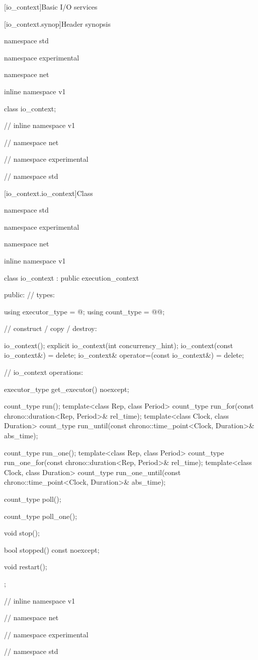 
[io_context]{Basic I/O services}


%
[io_context.synop]{Header  synopsis}

\begin{codeblock}
namespace std {
namespace experimental {
namespace net {
inline namespace v1 {

  class io_context;

} // inline namespace v1
} // namespace net
} // namespace experimental
} // namespace std
\end{codeblock}



[io_context.io_context]{Class }

%
\begin{codeblock}
namespace std {
namespace experimental {
namespace net {
inline namespace v1 {

  class io_context : public execution_context
  {
  public:
    // types:

    using executor_type = @\seebelow@;
    using count_type = @@;

    // construct / copy / destroy:

    io_context();
    explicit io_context(int concurrency_hint);
    io_context(const io_context&) = delete;
    io_context& operator=(const io_context&) = delete;

    // io_context operations:

    executor_type get_executor() noexcept;

    count_type run();
    template<class Rep, class Period>
      count_type run_for(const chrono::duration<Rep, Period>& rel_time);
    template<class Clock, class Duration>
      count_type run_until(const chrono::time_point<Clock, Duration>& abs_time);

    count_type run_one();
    template<class Rep, class Period>
      count_type run_one_for(const chrono::duration<Rep, Period>& rel_time);
    template<class Clock, class Duration>
      count_type run_one_until(const chrono::time_point<Clock, Duration>& abs_time);

    count_type poll();

    count_type poll_one();

    void stop();

    bool stopped() const noexcept;

    void restart();
  };

} // inline namespace v1
} // namespace net
} // namespace experimental
} // namespace std
\end{codeblock}

